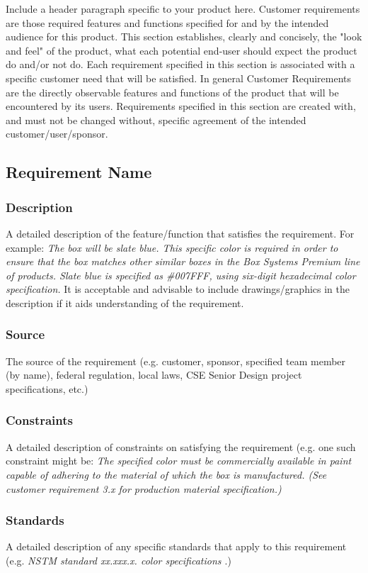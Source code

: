 Include a header paragraph specific to your product here. Customer requirements are those required features and functions specified for and by the intended audience for this product. This section establishes, clearly and concisely, the "look and feel" of the product, what each potential end-user should expect the product do and/or not do. Each requirement specified in this section is associated with a specific customer need that will be satisfied. In general Customer Requirements are the directly observable features and functions of the product that will be encountered by its users. Requirements specified in this section are created with, and must not be changed without, specific agreement of the intended customer/user/sponsor.

\subsection{Requirement Name}
\subsubsection{Description}
A detailed description of the feature/function that satisfies the requirement. For example: \textit{The box will be slate blue. This specific color is required in order to ensure that the box matches other similar boxes in the Box Systems Premium line of products. Slate blue is specified as \#007FFF, using six-digit hexadecimal color specification.} It is acceptable and advisable to include drawings/graphics in the description if it aids understanding of the requirement.
\subsubsection{Source}
The source of the requirement (e.g. customer, sponsor, specified team member (by name), federal regulation, local laws, CSE Senior Design project specifications, etc.)
\subsubsection{Constraints}
A detailed description of constraints on satisfying the requirement (e.g. one such constraint might be: \textit{The specified color must be commercially available in paint capable of adhering to the material of which the box is manufactured. (See customer requirement 3.x for production material specification.)}
\subsubsection{Standards}
A detailed description of any specific standards that apply to this requirement (e.g. \textit{NSTM standard xx.xxx.x. color specifications \cite{Rubin2012}}.)
